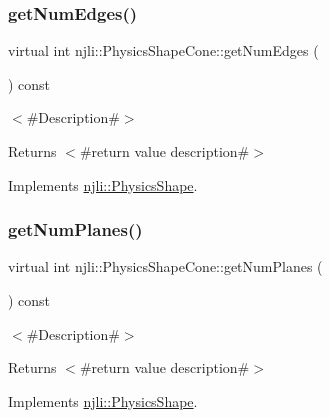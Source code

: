 \subsubsection{\texorpdfstring{get\+Num\+Edges()}{getNumEdges()}}
{\footnotesize\ttfamily virtual int njli\+::\+Physics\+Shape\+Cone\+::get\+Num\+Edges (\begin{DoxyParamCaption}{ }\end{DoxyParamCaption}) const\hspace{0.3cm}{\ttfamily [virtual]}}

$<$\#\+Description\#$>$

\begin{DoxyReturn}{Returns}
$<$\#return value description\#$>$ 
\end{DoxyReturn}


Implements \mbox{\hyperlink{classnjli_1_1_physics_shape_a24df999ba2b7ac0d9abda09c4f17c2fe}{njli\+::\+Physics\+Shape}}.

\mbox{\label{classnjli_1_1_physics_shape_cone_abb7a45ae2636b54cd6f986c2985daf65}} 
\subsubsection{\texorpdfstring{get\+Num\+Planes()}{getNumPlanes()}}
{\footnotesize\ttfamily virtual int njli\+::\+Physics\+Shape\+Cone\+::get\+Num\+Planes (\begin{DoxyParamCaption}{ }\end{DoxyParamCaption}) const\hspace{0.3cm}{\ttfamily [virtual]}}

$<$\#\+Description\#$>$

\begin{DoxyReturn}{Returns}
$<$\#return value description\#$>$ 
\end{DoxyReturn}


Implements \mbox{\hyperlink{classnjli_1_1_physics_shape_a11cb80220393bfce177b8bdc34f7f359}{njli\+::\+Physics\+Shape}}.

\mbox{\label{classnjli_1_1_physics_shape_cone_a7d37fd30a4ad7615fc17682d06824c11}} 
